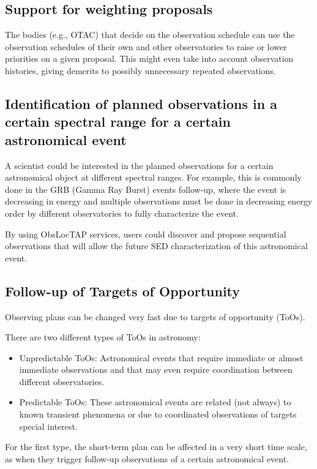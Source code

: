 \documentclass[11pt,a4paper]{ivoa}
\begin{document}
\subsection{Support for weighting proposals}
The bodies (e.g., OTAC) that decide on the observation schedule can use the observation schedules of their own and other observatories to raise or lower priorities on a given proposal. This might even take into   account observation histories, giving demerits to possibly unnecessary   repeated observations.

\subsection{Identification of planned observations in a certain spectral range for a certain astronomical event}
A scientist could be interested in the planned observations for a certain astronomical object at different spectral ranges. For example, this is commonly done in the GRB (Gamma Ray Burst) events follow-up, where the event is decreasing in energy and multiple observations must be done in decreasing energy order by different observatories to fully characterize the event.

By using ObsLocTAP services, users could discover and propose sequential observations that will allow the future SED characterization of this astronomical event.

\subsection{Follow-up of Targets of Opportunity}
Observing plans can be changed very fast due to targets of opportunity (ToOs).

There are two different types of ToOs in astronomy:
\begin{itemize}
	\item Unpredictable ToOs: Astronomical events that require immediate or almost immediate observations and that may even require coordination between different observatories.

	\item Predictable ToOs: These astronomical events are related (not always) to known transient phenomena or due to coordinated observations of targets special interest. 
\end{itemize}

For the first type, the short-term plan can be affected in a very short time scale, as when they trigger follow-up observations of a certain astronomical event.
\end{document}
